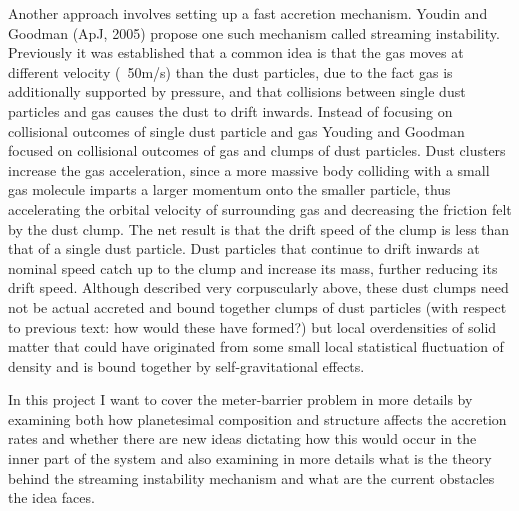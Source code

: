 \documentclass[12pt,letterpaper]{article}
\begin{document}
Another approach involves setting up a fast accretion mechanism. Youdin and Goodman (ApJ, 2005) propose one such mechanism called streaming instability. Previously it was established that a common idea is that the gas moves at different velocity (~50m/s) than the dust particles, due to the fact gas is additionally supported by pressure, and that collisions between single dust particles and gas causes the dust to drift inwards. Instead of focusing on collisional outcomes of single dust particle and gas Youding and Goodman focused on collisional outcomes of gas and clumps of dust particles. Dust clusters increase the gas acceleration, since a more massive body colliding with a small gas molecule imparts a larger momentum onto the smaller particle, thus accelerating the orbital velocity of surrounding gas and decreasing the friction felt by the dust clump. The net result is that the drift speed of the clump is less than that of a single dust particle. Dust particles that continue to drift inwards at nominal speed catch up to the clump and increase its mass, further reducing its drift speed. Although described very corpuscularly above, these dust clumps need not be actual accreted and bound together clumps of dust particles (with respect to previous text: how would these have formed?) but local overdensities of solid matter that could have originated from some small local statistical fluctuation of density and is bound together by self-gravitational effects. 

In this project I want to cover the meter-barrier problem in more details by examining both how planetesimal composition and structure affects the accretion rates and whether there are new ideas dictating how this would occur in the inner part of the system and also examining in more details what is the theory behind the streaming instability mechanism and what are the current obstacles the idea faces.



 
   
\end{document}
